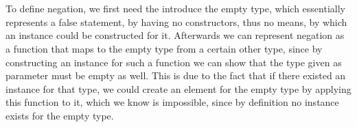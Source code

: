 \begin{code}
    \>[0]\AgdaSpace{}%
    \AgdaSpace{}%
    \AgdaSymbol{(}\AgdaSpace{}%
    \AgdaSpace{}%
    \AgdaSymbol{:}\AgdaSpace{}%
    \AgdaSymbol{)}\AgdaSpace{}%
    \AgdaSymbol{:}\AgdaSpace{}%
    \AgdaSpace{}%
    \<%
    \\
    \>[0][@{}l@{\AgdaIndent{0}}]%
    \>[2]\AgdaSpace{}%
    \AgdaSymbol{:}\AgdaSpace{}%
    \AgdaSymbol{(}\AgdaSpace{}%
    \AgdaSymbol{:}\AgdaSpace{}%
    \AgdaSymbol{)}\AgdaSpace{}%
    \AgdaSpace{}%
    \AgdaSpace{}%
    \AgdaSpace{}%
    \<%
    \\
    \>[2]\AgdaSpace{}%
    \AgdaSymbol{:}\AgdaSpace{}%
    \AgdaSymbol{(}\AgdaSpace{}%
    \AgdaSymbol{:}\AgdaSpace{}%
    \AgdaSymbol{)}\AgdaSpace{}%
    \AgdaSpace{}%
    \AgdaSpace{}%
    \AgdaSpace{}%
    \<%
\end{code}

To define negation, we first need the introduce the empty type, which essentially represents a false statement, by having no constructors, thus no means, by which an instance could be constructed for it. Afterwards we can represent negation as a function that maps to the empty type from a certain other type, since by constructing an instance for such a function we can show that the type given as parameter must be empty as well. This is due to the fact that if there existed an instance for that type, we could create an element for the empty type by applying this function to it, which we know is impossible, since by definition no instance exists for the empty type.

\begin{code}
    \>[0]\AgdaSpace{}%
    \AgdaSpace{}%
    \AgdaSymbol{:}\AgdaSpace{}%
    \AgdaSpace{}%
    \<%
    \\
    \>[0]\<%
    \\
    \\[\AgdaEmptyExtraSkip]%
    \>[0]\AgdaSpace{}%
    \AgdaSymbol{:}\AgdaSpace{}%
    \AgdaSpace{}%
    \AgdaSpace{}%
    \<%
    \\
    \>[0]\AgdaSpace{}%
    \AgdaSpace{}%
    \AgdaSymbol{=}\AgdaSpace{}%
    \AgdaSpace{}%
    \AgdaSpace{}%
    \<%
\end{code}


